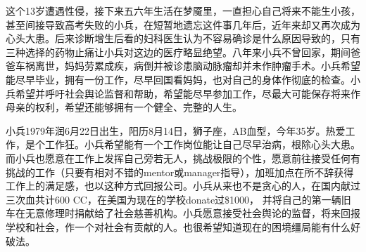 \documentclass[12pt]{book}
\begin{document}
这个13岁遭遇性侵，接下来五六年生活在梦魇里，一直担心自己将来不能生小孩，甚至间接导致高考失败的小兵，在短暂地遗忘这件事几年后，近年来却又再次成为心头大患。后来诊断增生后看的妇科医生认为不容易确诊是什么原因导致的，只有三种选择的药物止痛让小兵对这边的医疗略显绝望。八年来小兵不曾回家，期间爸爸车祸离世，妈妈劳累成疾，病倒并被诊患脑动脉瘤却并未作肿瘤手术。小兵希望能尽早毕业，拥有一份工作，尽早回国看妈妈，也对自己的身体作彻底的检查。小兵希望并呼吁社会舆论监督和帮助，希望能尽早参加工作，尽最大可能保存将来作母亲的权利，希望还能够拥有一个健全、完整的人生。

小兵1979年润6月22日出生，阳历8月14日，狮子座，AB血型，今年35岁。热爱工作，是个工作狂。小兵希望能有一个工作岗位能让自己尽早治病，根除心头大患。而小兵也愿意在工作上发挥自己旁若无人，挑战极限的个性，愿意前往接受任何有挑战的工作（只要有相对不错的mentor或manager指导），加班加点在所不辞获得工作上的满足感，也以这种方式回报公司。小兵从来也不是贪心的人，在国内献过三次血共计600 CC，在美国为现在的学校donate过\$1000， 并将自己的第一辆旧车在无意修理时捐献给了社会慈善机构。小兵愿意接受社会舆论的监督，将来回报学校和社会，作一个对社会有贡献的人。也很希望知道现在的困境缰局能有什么好破法。
\end{document}

